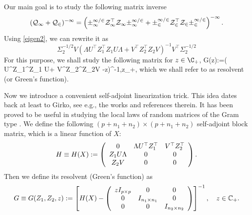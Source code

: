 Our main goal is to study the following matrix inverse
\begin{align*}
(\cal Q_1+\cal Q_2)^{-1}=\left( \Sigma_1^{1/2}Z_1^\top Z_1\Sigma_1^{1/2}+\Sigma_2^{1/2}Z_2^\top Z_2\Sigma_2^{1/2}\right)^{-1} .
\end{align*}
Using \eqref{eigen2}, we can rewrite it as
$$\Sigma_2^{-1/2}V\left(   \Lambda U^\top Z_1^\top Z_1 U\Lambda  + V^\top Z_2^\top Z_2V\right)^{-1}V^\top\Sigma_2^{-1/2}$$
For this purpose, we shall study the following matrix for $z\in \C_+$, 
\be\label{mainG}
\cal G(z):=\left(   \Lambda U^\top Z_1^\top Z_1 U\Lambda  + V^\top Z_2^\top Z_2V -z\right)^{-1},\quad z\in \C_+,
\ee
which we shall refer to as resolvent (or Green's function).

Now we introduce a convenient self-adjoint linearization trick. This idea dates back at least to Girko, see e.g., the works \cite{girko2012theory,girko1975random,girko1985spectral} and references therein. It has been proved to be useful in studying the local laws of random matrices of the Gram type \cite{Alt_Gram, AEK_Gram, Anisotropic, XYY_circular}. We define the following $(p+n_1+n_2)\times (p+n_1+n_2)$ self-adjoint block matrix, which is a linear function of $X$:
 \begin{equation}\label{linearize_block}
   H \equiv H(X): = \left( {\begin{array}{*{20}c}
   { 0 } & \Lambda U^{\top}Z_1^\top & V^\top Z_2^\top  \\
   {Z_1 U\Lambda  } & {0} & 0 \\
   {Z_2V} & 0 & 0
   \end{array}} \right).
 \end{equation}
Then we define its resolvent (Green's function) as
 \begin{equation}\label{eqn_defG}
 G \equiv G (Z_1,Z_2,z):= \left[H(X)-\left( {\begin{array}{*{20}c}
   { zI_{p\times p}} & 0 & 0 \\
   0 & { I_{n_1\times n_1}}  & 0\\
      0 & 0  & { I_{n_2\times n_2}}\\
\end{array}} \right)\right]^{-1} , \quad z\in \mathbb C_+ .
 \end{equation}


